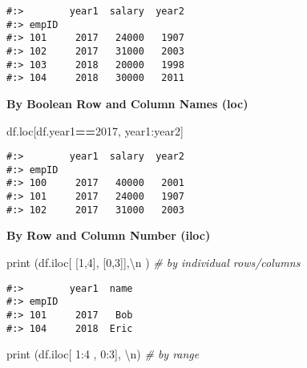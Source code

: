 \documentclass[
]{book}
\newenvironment{Shaded}{\begin{snugshade}}{\end{snugshade}}
\newcommand{\BuiltInTok}[1]{#1}
\newcommand{\CharTok}[1]{\textcolor[rgb]{0.5,0.5,0.5}{#1}}
\newcommand{\CommentTok}[1]{\textcolor[rgb]{0.37,0.37,0.37}{\textit{#1}}}
\newcommand{\DecValTok}[1]{\textcolor[rgb]{0.06,0.06,0.06}{#1}}
\newcommand{\NormalTok}[1]{#1}
\newcommand{\OperatorTok}[1]{\textcolor[rgb]{0.43,0.43,0.43}{\textbf{#1}}}
\newcommand{\StringTok}[1]{\textcolor[rgb]{0.5,0.5,0.5}{#1}}
\begin{document}
\begin{verbatim}
#:>        year1  salary  year2
#:> empID                      
#:> 101     2017   24000   1907
#:> 102     2017   31000   2003
#:> 103     2018   20000   1998
#:> 104     2018   30000   2011
\end{verbatim}

\textbf{By Boolean Row and Column Names (loc)}

\begin{Shaded}
\begin{Highlighting}[]
\NormalTok{df.loc[df.year1}\OperatorTok{==}\DecValTok{2017}\NormalTok{, }\StringTok{\textquotesingle{}year1\textquotesingle{}}\NormalTok{:}\StringTok{\textquotesingle{}year2\textquotesingle{}}\NormalTok{]}
\end{Highlighting}
\end{Shaded}

\begin{verbatim}
#:>        year1  salary  year2
#:> empID                      
#:> 100     2017   40000   2001
#:> 101     2017   24000   1907
#:> 102     2017   31000   2003
\end{verbatim}

\textbf{By Row and Column Number (iloc)}

\begin{Shaded}
\begin{Highlighting}[]
\BuiltInTok{print}\NormalTok{ (df.iloc[ [}\DecValTok{1}\NormalTok{,}\DecValTok{4}\NormalTok{], [}\DecValTok{0}\NormalTok{,}\DecValTok{3}\NormalTok{]],}\StringTok{\textquotesingle{}}\CharTok{\textbackslash{}n}\StringTok{\textquotesingle{}}\NormalTok{ )   }\CommentTok{\# by individual rows/columns}
\end{Highlighting}
\end{Shaded}

\begin{verbatim}
#:>        year1  name
#:> empID             
#:> 101     2017   Bob
#:> 104     2018  Eric
\end{verbatim}

\begin{Shaded}
\begin{Highlighting}[]
\BuiltInTok{print}\NormalTok{ (df.iloc[  }\DecValTok{1}\NormalTok{:}\DecValTok{4}\NormalTok{ ,  }\DecValTok{0}\NormalTok{:}\DecValTok{3}\NormalTok{], }\StringTok{\textquotesingle{}}\CharTok{\textbackslash{}n}\StringTok{\textquotesingle{}}\NormalTok{)    }\CommentTok{\# by range}
\end{Highlighting}
\end{Shaded}
\end{document}
